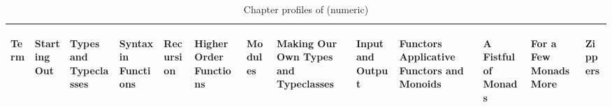 \begin{table*}[h!]
\begin{minipage}[b]{0.5\linewidth}
{\begin{tabular}{lllllllllllll}
\begin{sideways} Term \end{sideways} & \begin{sideways} Starting Out \end{sideways} & \begin{sideways} Types and Typeclasses \end{sideways} & \begin{sideways} Syntax in Functions \end{sideways} & \begin{sideways} Recursion \end{sideways} & \begin{sideways} Higher Order Functions \end{sideways} & \begin{sideways} Modules \end{sideways} & \begin{sideways} Making Our Own Types and Typeclasses \end{sideways} & \begin{sideways} Input and Output \end{sideways} & \begin{sideways} Functors  Applicative Functors and Monoids \end{sideways} & \begin{sideways} A Fistful of Monads \end{sideways} & \begin{sideways} For a Few Monads More \end{sideways} & \begin{sideways} Zippers \end{sideways} \\ 
  \hline
    
   \hline
\end{tabular}}
\caption{Chapter profiles of \lyahTag{} (numeric)}
\label{T:chapterProfilesRWHNumeric}
\end{minipage}
\end{table*}


